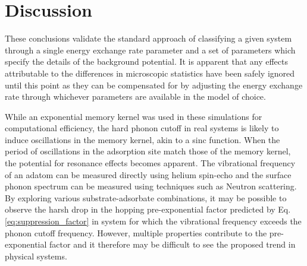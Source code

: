\documentclass[7pt]{article}
\begin{document}
\section*{Discussion}

These conclusions validate the standard approach of classifying a given system through a single energy exchange rate parameter and a set of parameters which specify the details of the background potential. It is apparent that any effects attributable to the differences in microscopic statistics have been safely ignored until this point as they can be compensated for by adjusting the energy exchange rate through whichever parameters are available in the model of choice.

While an exponential memory kernel was used in these simulations for computational efficiency, the hard phonon cutoff in real systems is likely to induce oscillations in the memory kernel, akin to a sinc function. When the period of oscillations in the adsorption site match those of the memory kernel, the potential for resonance effects becomes apparent. The vibrational frequency of an adatom can be measured directly using helium spin-echo and the surface phonon spectrum can be measured using techniques such as Neutron scattering\cite{Sinha}. By exploring various substrate-adsorbate combinations, it may be possible to observe the harsh drop in the hopping pre-exponential factor predicted by Eq. \ref{eq:suppression_factor} in system for which the vibrational frequency exceeds the phonon cutoff frequency. However, multiple properties contribute to the pre-exponential factor and it therefore may be difficult to see the proposed trend in physical systems. 



\end{document}
